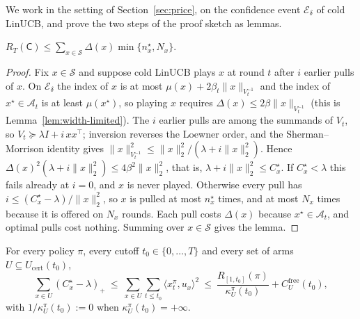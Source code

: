 \documentclass[anon]{alt2027} %
\newcommand{\Cold}{\mathsf{C}}
\begin{document}
We work in the setting of Section~\ref{sec:price}, on the confidence event
$\mathcal E_\delta$ of cold LinUCB, and prove the two steps of the proof
sketch as lemmas.

\begin{lemma}
\label{lem:cold-price}
$R_T(\Cold)\le\sum_{x\in\mathcal S}\Delta(x)\min\{n^\star_x,N_x\}$.
\end{lemma}

\begin{proof}
Fix $x\in \mathcal S$ and suppose cold LinUCB plays $x$ at round $t$ after
$i$ earlier pulls of $x$. On $\mathcal E_\delta$ the index of $x$ is at most
$\mu(x)+2\beta_t\|x\|_{V_t^{-1}}$ and the index of $x^\star\in\mathcal A_t$
is at least $\mu(x^\star)$, so playing $x$ requires
$\Delta(x)\le2\beta\|x\|_{V_t^{-1}}$ (this is Lemma~\ref{lem:width-limited}).
The $i$ earlier pulls are among the summands of $V_t$, so
$V_t\succeq\lambda I+i\,xx^\top$; inversion reverses the Loewner order, and
the Sherman--Morrison identity gives
$\|x\|^2_{V_t^{-1}}\le\|x\|_2^2/(\lambda+i\|x\|_2^2)$. Hence
$\Delta(x)^2(\lambda+i\|x\|_2^2)\le4\beta^2\|x\|_2^2$, that is,
$\lambda+i\|x\|_2^2\le C^\star_x$. If $C^\star_x<\lambda$ this fails already at $i=0$, and
$x$ is never played. Otherwise every pull has
$i\le(C^\star_x-\lambda)/\|x\|_2^2$, so $x$ is pulled at most $n^\star_x$ times, and at
most $N_x$ times because it is offered on $N_x$ rounds. Each pull costs
$\Delta(x)$ because $x^\star\in\mathcal A_t$, and optimal pulls cost nothing.
Summing over $x\in \mathcal S$ gives the lemma.
\end{proof}

\begin{lemma}
\label{lem:cert-cost}
For every policy $\pi$, every cutoff $t_0\in\{0,\dots,T\}$ and every set of
arms $U\subseteq U_{\mathrm{cert}}(t_0)$,
\[
\sum_{x\in U}(C^\star_x-\lambda)_+\ \le\ \sum_{x\in U}\sum_{t\le t_0}\langle x^\pi_t,u_x\rangle^2
\ \le\ \frac{R_{[1,t_0]}(\pi)}{\kappa^\pi_U(t_0)}+C^{\mathrm{free}}_U(t_0),
\]
with $1/\kappa^\pi_U(t_0):=0$ when $\kappa^\pi_U(t_0)=+\infty$.
\end{lemma}
\end{document}
